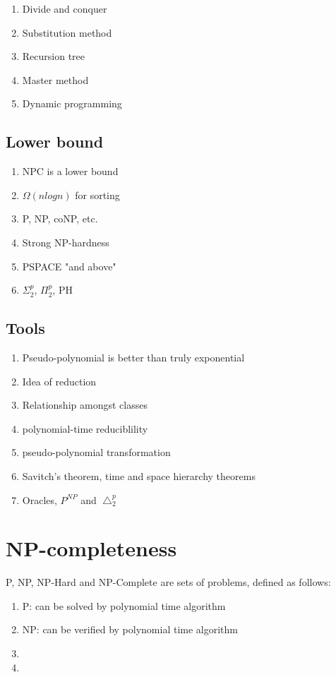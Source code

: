 \documentclass[12pt]{article}
\begin{document}
\begin{enumerate}
    \item Divide and conquer
    \item Substitution method
    \item Recursion tree
    \item Master method
    \item Dynamic programming
\end{enumerate}

\subsection{Lower bound}

\begin{enumerate}
    \item NPC is a lower bound
    \item $\Omega(nlogn)$ for sorting
    \item P, NP, coNP, etc.
    \item Strong NP-hardness
    \item PSPACE "and above"
    \item $\Sigma_2^p$, $\Pi_2^p$, {PH}
\end{enumerate}

\subsection{Tools}

\begin{enumerate}
    \item Pseudo-polynomial is better than truly exponential 
    \item Idea of reduction
    \item Relationship amongst classes
    \item polynomial-time reduciblility
    \item pseudo-polynomial transformation
    \item Savitch's theorem, time and space hierarchy theorems
    \item Oracles, $P^{NP}$ and $\bigtriangleup _2^p$
\end{enumerate}

\section{NP-completeness} 

P, NP, NP-Hard and NP-Complete are sets of problems, defined as follows:
\begin{enumerate}
    \item P: can be solved by polynomial time algorithm
    \item NP: can be verified by polynomial time algorithm
    \item
    \item
\end{enumerate}
\end{document}

